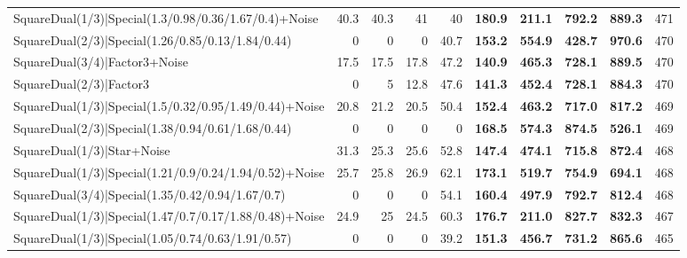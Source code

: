 \begin{tabular}{lrrrrllllr}
 SquareDual(1/3)|Special(1.3/0.98/0.36/1.67/0.4)+Noise   &         40.3 &         40.3 &         41   &            40   & \textbf{180.9} & \textbf{211.1} & \textbf{792.2} & \textbf{889.3}  &          471 \\
 SquareDual(2/3)|Special(1.26/0.85/0.13/1.84/0.44)       &          0   &          0   &          0   &            40.7 & \textbf{153.2} & \textbf{554.9} & \textbf{428.7} & \textbf{970.6}  &          470 \\
 SquareDual(3/4)|Factor3+Noise                           &         17.5 &         17.5 &         17.8 &            47.2 & \textbf{140.9} & \textbf{465.3} & \textbf{728.1} & \textbf{889.5}  &          470 \\
 SquareDual(2/3)|Factor3                                 &          0   &          5   &         12.8 &            47.6 & \textbf{141.3} & \textbf{452.4} & \textbf{728.1} & \textbf{884.3}  &          470 \\
 SquareDual(1/3)|Special(1.5/0.32/0.95/1.49/0.44)+Noise  &         20.8 &         21.2 &         20.5 &            50.4 & \textbf{152.4} & \textbf{463.2} & \textbf{717.0} & \textbf{817.2}  &          469 \\
 SquareDual(2/3)|Special(1.38/0.94/0.61/1.68/0.44)       &          0   &          0   &          0   &             0   & \textbf{168.5} & \textbf{574.3} & \textbf{874.5} & \textbf{526.1}  &          469 \\
 SquareDual(1/3)|Star+Noise                              &         31.3 &         25.3 &         25.6 &            52.8 & \textbf{147.4} & \textbf{474.1} & \textbf{715.8} & \textbf{872.4}  &          468 \\
 SquareDual(1/3)|Special(1.21/0.9/0.24/1.94/0.52)+Noise  &         25.7 &         25.8 &         26.9 &            62.1 & \textbf{173.1} & \textbf{519.7} & \textbf{754.9} & \textbf{694.1}  &          468 \\
 SquareDual(3/4)|Special(1.35/0.42/0.94/1.67/0.7)        &          0   &          0   &          0   &            54.1 & \textbf{160.4} & \textbf{497.9} & \textbf{792.7} & \textbf{812.4}  &          468 \\
 SquareDual(1/3)|Special(1.47/0.7/0.17/1.88/0.48)+Noise  &         24.9 &         25   &         24.5 &            60.3 & \textbf{176.7} & \textbf{211.0} & \textbf{827.7} & \textbf{832.3}  &          467 \\
 SquareDual(1/3)|Special(1.05/0.74/0.63/1.91/0.57)       &          0   &          0   &          0   &            39.2 & \textbf{151.3} & \textbf{456.7} & \textbf{731.2} & \textbf{865.6}  &          465 \\

\end{tabular}
